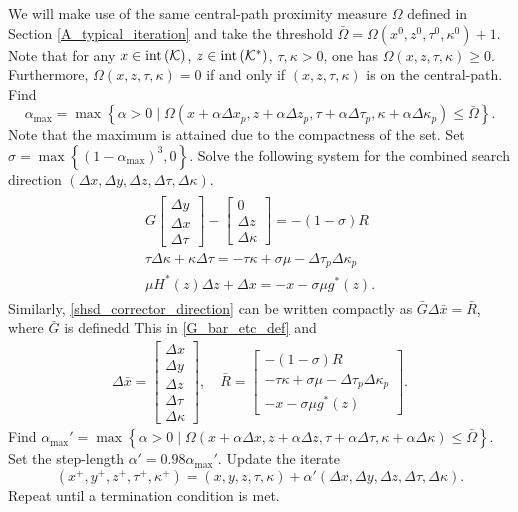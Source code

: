 \documentclass[11pt]{article}
\theoremstyle{definition}
\theoremstyle{plain}
\def\interior{\protect{\textnormal{int}}}
\begin{document}
We will make use of the same central-path proximity measure $\Omega$ defined in Section \ref{A_typical_iteration} and take the threshold $\bar{\Omega} = \Omega\left(x^0, z^0, \tau^0, \kappa^0\right)+1$. Note that for any $x\in \interior\left(\mathcal{K}\right)$, $z\in \interior\left(\mathcal{K}^*\right)$, $\tau,\kappa > 0$, one has $\Omega(x,z,\tau,\kappa) \geq 0$. Furthermore, $\Omega(x,z,\tau,\kappa) = 0$ if and only if $(x,z,\tau,\kappa)$ is on the central-path. Find \[\alpha_{\max} = \max \left\{\alpha > 0 \mid \Omega(x+\alpha\Delta x_p,z+\alpha\Delta z_p,\tau+\alpha\Delta\tau_p,\kappa+\alpha\Delta\kappa_p)\leq \bar\Omega\right\}.\] Note that the maximum is attained due to the compactness of the set. Set $\sigma = \max \left\{ (1-\alpha_{\max})^3, 0 \right\}$. Solve the following system for the combined search direction $(\Delta x, \Delta y, \Delta z, \Delta \tau, \Delta \kappa)$.
\begin{align}
\begin{split}
G \begin{bmatrix}
\Delta y \\ \Delta x \\ \Delta \tau
\end{bmatrix} - 
\begin{bmatrix}
0 \\ \Delta z \\ \Delta \kappa
\end{bmatrix} = -\left(1-\sigma\right)R \\[1ex]
\tau\Delta \kappa+\kappa\Delta \tau = -\tau\kappa + \sigma \mu - \Delta \tau_p \Delta \kappa_p \\[1ex]
\mu H^*(z)\Delta z + \Delta x = -x - \sigma\mu g^*(z).
\end{split}	\label{shsd_corrector_direction}
\end{align}
Similarly, \eqref{shsd_corrector_direction} can be written compactly as $\bar G \Delta \bar x = \bar R$, where $\bar G$ is definedd This in \eqref{G_bar_etc_def} and 
\begin{align}\label{G_Bar_etc_2}
\Delta \bar{x} = \begin{bmatrix}
\Delta x \\ \Delta y \\ \Delta z \\ \Delta \tau \\ \Delta \kappa
\end{bmatrix},\quad \bar{R} = \begin{bmatrix}
-\left(1-\sigma\right)R \\ -\tau\kappa +\sigma \mu - \Delta \tau_p \Delta \kappa_p\\ -x - \sigma\mu g^*(z)
\end{bmatrix}.
\end{align}
Find $\alpha_{\max}' = \max \left\{\alpha > 0 \mid \Omega(x+\alpha\Delta x,z+\alpha\Delta z,\tau+\alpha\Delta\tau,\kappa+\alpha\Delta\kappa)\leq \bar\Omega\right\}$. Set the step-length $\alpha' = 0.98\alpha_{\max}'$. Update the iterate \[(x^+,y^+,z^+, \tau^+, \kappa^+) = (x,y,z,\tau,\kappa) + \alpha' (\Delta x, \Delta y, \Delta z, \Delta \tau, \Delta \kappa).\] Repeat until a termination condition is met.
\end{document}
